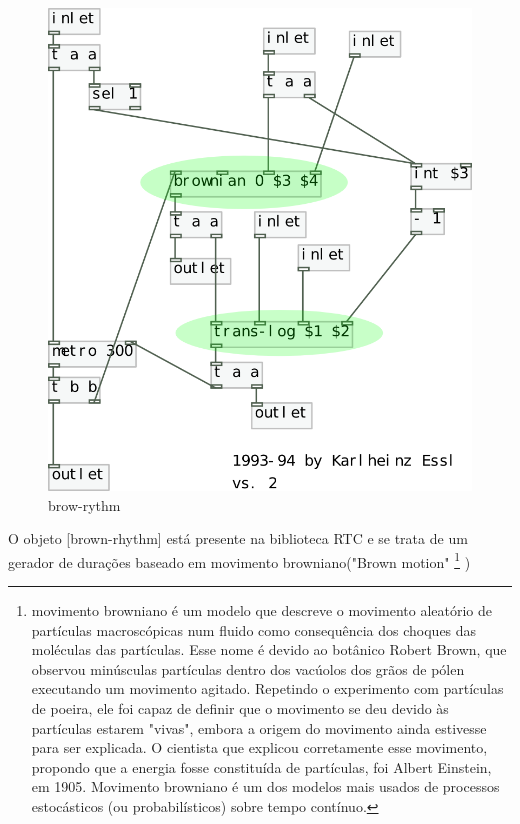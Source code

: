 \documentclass{ppgmus}
\begin{document}
 \begin{figure}
\includegraphics[scale=.6]{brown-rythm}
\caption{brow-rythm}
\label{brown-rythm}
\end{figure}  

O objeto [brown-rhythm] está presente na biblioteca RTC e se trata de
um gerador de durações baseado em movimento browniano("Brown motion"
\footnote{movimento browniano é um modelo que descreve o movimento aleatório 
de partículas macroscópicas num fluido como consequência dos choques das 
moléculas das partículas. Esse nome é devido ao botânico Robert
Brown, que observou minúsculas partículas dentro dos vacúolos dos grãos de 
pólen executando um movimento agitado. Repetindo o experimento com partículas de poeira, 
ele foi capaz de definir que o movimento se deu devido às partículas estarem "vivas", 
embora a origem do movimento ainda estivesse para ser explicada.
O cientista que explicou corretamente esse movimento, propondo que a energia fosse 
constituída de partículas, foi Albert Einstein, em 1905.
Movimento browniano é um dos modelos mais usados de processos estocásticos
(ou probabilísticos) sobre tempo contínuo.} )
\end{document}
